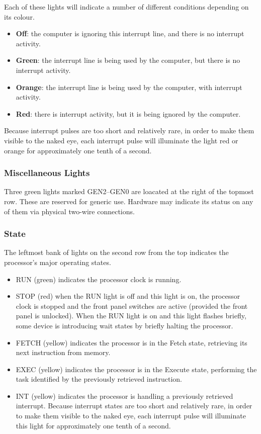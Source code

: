 \documentclass[11pt,a4paper,twocolumns]{article}
\newcommand{\lt}[1]{\textsf{#1}}
\begin{document}
Each of these lights will indicate a number of different conditions depending
on its colour.

\begin{itemize}
  \item {\bf Off}: the computer is ignoring this interrupt line, and there is
    no interrupt activity.
  \item {\bf Green}: the interrupt line is being used by the computer, but
    there is no interrupt activity.
  \item {\bf Orange}: the interrupt line is being used by
    the computer, with interrupt activity.
  \item {\bf Red}: there is interrupt activity, but it is being ignored
    by the computer.
\end{itemize}

Because interrupt pulses are too short and relatively rare, in order to make
them visible to the naked eye, each interrupt pulse will illuminate the light
red or orange for approximately one tenth of a second.

\subsubsection{Miscellaneous Lights}

Three green lights marked \lt{GEN2}–\lt{GEN0} are loacated at the right of the
topmost row. These are reserved for generic use. Hardware may indicate its
status on any of them via physical two-wire connections.

\subsubsection{State}

The leftmost bank of lights on the second row from the top indicates the
processor's major operating states.

\begin{itemize}
\item \lt{RUN} (green) indicates the processor clock is running.
\item \lt{STOP} (red) when the \lt{RUN} light is off and this light is
  on, the processor clock is stopped and the front panel switches are
  active (provided the front panel is unlocked). When the \lt{RUN}
  light is on and this light flashes briefly, some device is
  introducing wait states by briefly halting the processor.
\item \lt{FETCH} (yellow) indicates the processor is in the Fetch state,
  retrieving its next instruction from memory.
\item \lt{EXEC} (yellow) indicates the processor is in the Execute state,
  performing the task identified by the previously retrieved instruction.
\item \lt{INT} (yellow) indicates the processor is handling a previously
  retrieved interrupt. Because interrupt states are too short and relatively
  rare, in order to make them visible to the naked eye, each interrupt pulse
  will illuminate this light for approximately one tenth of a second.
\end{itemize}
\end{document}
